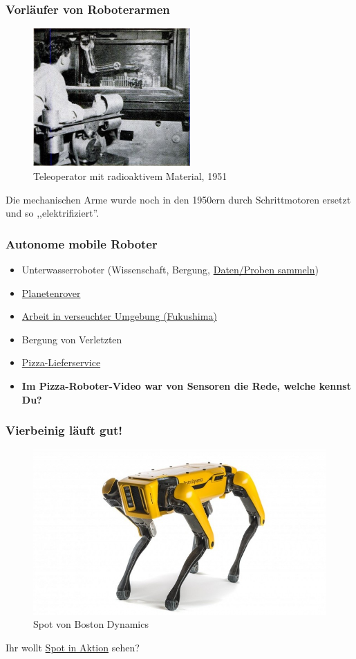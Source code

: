 \documentclass{beamer}
\begin{document}
\begin{frame}
\frametitle{Vorläufer von Roboterarmen}
\begin{figure}
  \includegraphics[width=6cm]{arm.jpg}
  \caption{Teleoperator mit radioaktivem Material, 1951}
  \label{fig:arm1}
\end{figure}

Die mechanischen Arme wurde noch in den 1950ern durch Schrittmotoren ersetzt und so ,,elektrifiziert''.
\end{frame}

\begin{frame}
\frametitle{Autonome mobile Roboter}
\begin{itemize}
\item  Unterwasserroboter (Wissenschaft, Bergung, \href{https://youtu.be/dF1Yb3Fa5sE?t=257}{Daten/Proben sammeln}) 
\item  \href{https://www.youtube.com/watch?v=5qqsMjy8Rx0}{Planetenrover}
\item  \href{https://www.youtube.com/watch?v=mhQixNlLF_k}{Arbeit in verseuchter Umgebung (Fukushima)}
\item  Bergung von Verletzten
\item  \href{https://www.youtube.com/watch?v=ujzjZuhE92g}{Pizza-Lieferservice} 
\item \textbf{Im Pizza-Roboter-Video war von Sensoren die Rede, welche kennst Du?}
\end{itemize}
\end{frame}

\begin{frame}
\frametitle{Vierbeinig läuft gut!}
\begin{figure}
  \includegraphics[width=\linewidth]{spot.png}
  \caption{Spot von Boston Dynamics}
  \label{fig:spot1}
\end{figure}

Ihr wollt \href{https://www.youtube.com/watch?v=OnWolLQSZic&feature=youtu.be}{Spot in Aktion} sehen? 
\end{frame}
\end{document}
